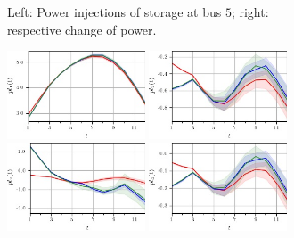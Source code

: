 \documentclass[final,3p,times,twocolumn]{elsarticle}  %
\begin{document}
\begin{figure}
\begin{subfigure}[c]{\figwidth}
		\vspace{-2mm}
		\caption{Left: Power injections of storage at bus $5$; right: respective change of power.}
		\label{fig:case5:Storage_volatile}
	\end{subfigure}
	\begin{subfigure}[c]{\figwidth}
	\centering
        \includegraphics[width=0.45\textwidth]{figures/time series/case5_volatile/line_901.jpg}
        \includegraphics[width=0.45\textwidth]{figures/time series/case5_volatile/line_902.jpg}
        \includegraphics[width=0.45\textwidth]{figures/time series/case5_volatile/line_903.jpg}
        \includegraphics[width=0.45\textwidth]{figures/time series/case5_volatile/line_904.jpg}

\end{subfigure}
\end{figure}
\end{document}
